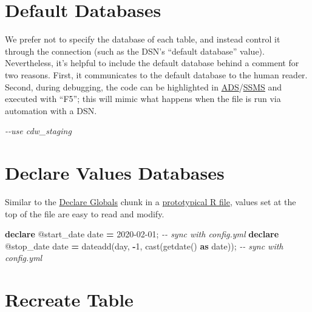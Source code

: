 \documentclass[
]{book}
\newenvironment{Shaded}{\begin{snugshade}}{\end{snugshade}}
\newcommand{\CommentTok}[1]{\textcolor[rgb]{0.56,0.35,0.01}{\textit{#1}}}
\newcommand{\DataTypeTok}[1]{\textcolor[rgb]{0.13,0.29,0.53}{#1}}
\newcommand{\DecValTok}[1]{\textcolor[rgb]{0.00,0.00,0.81}{#1}}
\newcommand{\FunctionTok}[1]{\textcolor[rgb]{0.00,0.00,0.00}{#1}}
\newcommand{\KeywordTok}[1]{\textcolor[rgb]{0.13,0.29,0.53}{\textbf{#1}}}
\newcommand{\NormalTok}[1]{#1}
\newcommand{\OperatorTok}[1]{\textcolor[rgb]{0.81,0.36,0.00}{\textbf{#1}}}
\newcommand{\StringTok}[1]{\textcolor[rgb]{0.31,0.60,0.02}{#1}}
\begin{document}
\hypertarget{sql-default-database}{%
\section{Default Databases}\label{sql-default-database}}

We prefer not to specify the database of each table, and instead control it through the connection (such as the DSN's ``default database'' value). Nevertheless, it's helpful to include the default database behind a comment for two reasons. First, it communicates to the default database to the human reader. Second, during debugging, the code can be highlighted in \protect\hyperlink{workstation-ads}{ADS}/\protect\hyperlink{workstation-ssms}{SSMS} and executed with ``F5''; this will mimic what happens when the file is run via automation with a DSN.

\begin{Shaded}
\begin{Highlighting}[]
\CommentTok{{-}{-}use cdw\_staging}
\end{Highlighting}
\end{Shaded}

\hypertarget{sql-declare}{%
\section{Declare Values Databases}\label{sql-declare}}

Similar to the \protect\hyperlink{chunk-declare}{Declare Globals} chunk in a \href{file-prototype-r}{prototypical R file}, values set at the top of the file are easy to read and modify.

\begin{Shaded}
\begin{Highlighting}[]
\KeywordTok{declare}\NormalTok{ @start\_date }\DataTypeTok{date} \OperatorTok{=} \StringTok{\textquotesingle{}2020{-}02{-}01\textquotesingle{}}\NormalTok{;                               }\CommentTok{{-}{-} sync with config.yml}
\KeywordTok{declare}\NormalTok{ @stop\_date  }\DataTypeTok{date} \OperatorTok{=}\NormalTok{ dateadd(}\DataTypeTok{day}\NormalTok{, }\OperatorTok{{-}}\DecValTok{1}\NormalTok{, }\FunctionTok{cast}\NormalTok{(getdate() }\KeywordTok{as} \DataTypeTok{date}\NormalTok{));  }\CommentTok{{-}{-} sync with config.yml}
\end{Highlighting}
\end{Shaded}

\hypertarget{sql-recreate}{%
\section{Recreate Table}\label{sql-recreate}}
\end{document}
